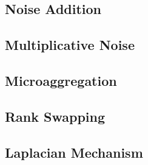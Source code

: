 \subsection{Noise Addition}
\label{Theory::SDCMethods::NoiseAddition}

\subsection{Multiplicative Noise}
\label{Theory::SDCMethods::MultiplicativeNoise}

\subsection{Microaggregation}
\label{Theory::SDCMethods::Microaggregation}

\subsection{Rank Swapping}
\label{Theory::SDCMethods::RankSwapping}

\subsection{Laplacian Mechanism}
\label{Theory::SDCMethods::LaplacianMechanism}